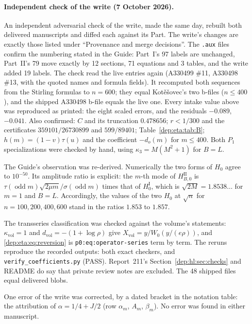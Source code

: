 \documentclass[11pt]{article}
\theoremstyle{definition}\newtheorem{definition}[theorem]{Definition}
\theoremstyle{remark}\newtheorem{remark}[theorem]{Remark}
\newcommand{\odd}{\operatorname{odd}}
\newcommand{\file}[1]{\nolinkurl{#1}}
\newcommand{\vol}{\mathrm{vol}}
\begin{document}
\paragraph{Independent check of the write (7 October 2026).} An independent
adversarial check of the write, made the same day, rebuilt both delivered
manuscripts and diffed each against its Part. The write's changes are exactly
those listed under ``Provenance and merge decisions''. The \texttt{.aux} files
confirm the numbering stated in the Guide: Part~I's 97 labels are unchanged,
Part~II's 79 move exactly by 12 sections, 71 equations and 3 tables, and the
write added 19 labels. The check read the live entries again (A330499 \#11,
A330498 \#13, with the quoted names and formula fields). It recomputed both
sequences from the Stirling formulas to $n=600$; they equal Kot\v{e}\v{s}ovec's
two b-files ($n\le400$), and the shipped A330498 b-file equals the live one.
Every intake value above was reproduced as printed: the eight scaled errors,
and the residuals $-0.089$, $-0.041$. Also confirmed: $C$ and its truncation
$0.478656$; $r<1/300$ and the certificates $359101/26730899$ and $599/89401$;
Table~\ref{dep:eta:tab:B}; $h(m)=(1-v)\tau(u)$ and the coefficient
$-d_o(m)$ for $m\le400$. Both $P_1$ specializations were checked by hand,
using $\kappa_3=M(M^2+1)$ for $B=L$.

The Guide's observation was re-derived. Numerically the two forms of $H_0$
agree to $10^{-50}$. Its amplitude ratio is explicit: the $m$-th mode of
$H_{B,0}^{\mathrm{II}}$ is $\tau(\odd m)\sqrt{2\mu m}/\sigma(\odd m)$ times
that of $H_0^{\mathrm I}$, which is $\sqrt{2M}=1.8538\ldots$ for $m=1$ and
$B=L$. Accordingly, the values of the two $H_0$ at $\sqrt n$ for
$n=100,200,400,600$ stand in the ratios $1.853$ to $1.857$.

The transseries classification was checked against the volume's statements:
$\kappa_\vol=1$ and $d_\vol=-(1+\log\rho)$ give $X_\vol=y/W_0(y/(e\rho))$, and
\eqref{dep:eta:eq:reversion} is \file{p0:eq:operator-series} term by term.
The reruns reproduce the recorded outputs: both exact checkers, and
\file{verify_coefficients.py} (PASS). Report~211's Section~\ref{dep:hl:sec:checks}
and README do say that private review notes are excluded. The 48 shipped
files equal delivered blobs.

One error of the write was corrected, by a dated bracket in the notation
table: the attribution of $\alpha=1/4+J/2$ (row $\alpha_m$, $A_m$,
$\beta_m$). No error was found in either manuscript.
\end{document}
